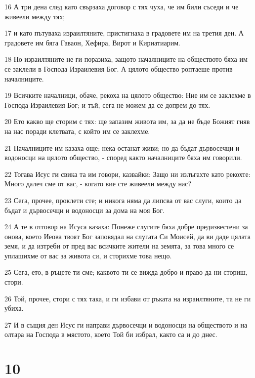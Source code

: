 \par 16 А три дена след като свързаха договор с тях чуха, че им били съседи и че живеели между тях;
\par 17 и като пътуваха израилтяните, пристигнаха в градовете им на третия ден. А градовете им бяга Гаваон, Хефира, Вирот и Кириатиарим.
\par 18 Но израилтяните не ги поразиха, защото началниците на обществото бяха им се заклели в Господа Израилевия Бог. А цялото общество роптаеше против началниците.
\par 19 Всичките началници, обаче, рекоха на цялото общество: Ние им се заклехме в Господа Израилевия Бог; и тъй, сега не можем да се допрем до тях.
\par 20 Ето какво ще сторим с тях: ще запазим живота им, за да не бъде Божият гняв на нас поради клетвата, с който им се заклехме.
\par 21 Началниците им казаха още: нека останат живи; но да бъдат дървосечци и водоносци на цялото общество, - според както началниците бяха им говорили.
\par 22 Тогава Исус ги свика та им говори, казвайки: Защо ни излъгахте като рекохте: Много далеч сме от вас, - когато вие сте живеели между нас?
\par 23 Сега, прочее, проклети сте; и никога няма да липсва от вас слуги, които да бъдат и дървосечци и водоносци за дома на моя Бог.
\par 24 А те в отговор на Исуса казаха: Понеже слугите бяха добре предизвестени за онова, което Иеова твоят Бог заповядал на слугата Си Моисей, да ви даде цялата земя, и да изтреби от пред вас всичките жители на земята, за това много се уплашихме от вас за живота си, и сторихме това нещо.
\par 25 Сега, ето, в ръцете ти сме; каквото ти се вижда добро и право да ни сториш, стори.
\par 26 Той, прочее, стори с тях така, и ги избави от ръката на израилтяните, та не ги убиха.
\par 27 И в същия ден Исус ги направи дървосечци и водоносци на обществото и на олтара на Господа в мястото, което Той би избрал, както са и до днес.

\chapter{10}

